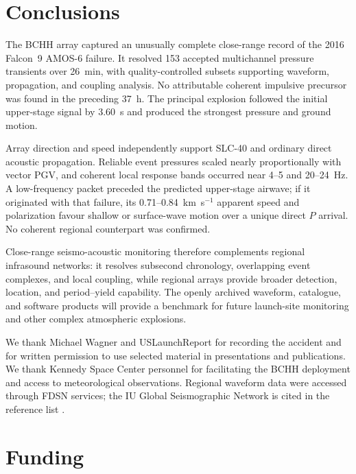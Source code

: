 \documentclass[]{seismica}
\begin{document}
\section{Conclusions}
\label{sec:conclusions}

The BCHH array captured an unusually complete close-range record of the 2016
Falcon~9 AMOS-6 failure. It resolved 153 accepted multichannel pressure
transients over 26~min, with quality-controlled subsets supporting waveform,
propagation, and coupling analysis. No attributable coherent impulsive
precursor was found in the preceding 37~h. The principal explosion followed
the initial upper-stage signal by 3.60~s and produced the strongest pressure
and ground motion.

Array direction and speed independently support SLC-40 and ordinary direct
acoustic propagation. Reliable event pressures scaled nearly proportionally
with vector PGV, and coherent local response bands occurred near 4--5 and
20--24~Hz. A low-frequency packet preceded the predicted upper-stage airwave;
if it originated with that failure, its 0.71--0.84~km~s$^{-1}$ apparent speed
and polarization favour shallow or surface-wave motion over a unique direct
$P$ arrival. No coherent regional counterpart was confirmed.

Close-range seismo-acoustic monitoring therefore complements regional
infrasound networks: it resolves subsecond chronology, overlapping event
complexes, and local coupling, while regional arrays provide broader detection,
location, and period--yield capability. The openly archived waveform,
catalogue, and software products will provide a benchmark for future
launch-site monitoring and other complex atmospheric explosions.

\begin{acknowledgements}
We thank Michael Wagner and USLaunchReport for recording the accident and for
written permission to use selected material in presentations and publications.
We thank Kennedy Space Center personnel for facilitating the BCHH deployment
and access to meteorological observations. Regional waveform data were
accessed through FDSN services; the IU Global Seismographic Network is cited
in the reference list \citep{asl_gsn_iu_1988}.
\end{acknowledgements}

\section*{Funding}
\end{document}
